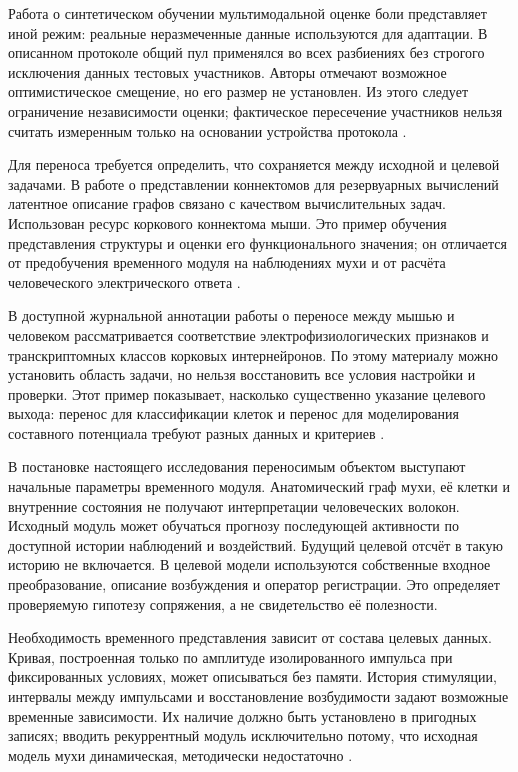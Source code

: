 Работа о синтетическом обучении мультимодальной оценке боли представляет иной режим: реальные неразмеченные данные используются для адаптации. В описанном протоколе общий пул применялся во всех разбиениях без строгого исключения данных тестовых участников. Авторы отмечают возможное оптимистическое смещение, но его размер не установлен. Из этого следует ограничение независимости оценки; фактическое пересечение участников нельзя считать измеренным только на основании устройства протокола \cite{s149}.

Для переноса требуется определить, что сохраняется между исходной и целевой задачами. В работе о представлении коннектомов для резервуарных вычислений латентное описание графов связано с качеством вычислительных задач. Использован ресурс коркового коннектома мыши. Это пример обучения представления структуры и оценки его функционального значения; он отличается от предобучения временного модуля на наблюдениях мухи и от расчёта человеческого электрического ответа \cite{s892}.

В доступной журнальной аннотации работы о переносе между мышью и человеком рассматривается соответствие электрофизиологических признаков и транскриптомных классов корковых интернейронов. По этому материалу можно установить область задачи, но нельзя восстановить все условия настройки и проверки. Этот пример показывает, насколько существенно указание целевого выхода: перенос для классификации клеток и перенос для моделирования составного потенциала требуют разных данных и критериев \cite{s873}.

В постановке настоящего исследования переносимым объектом выступают начальные параметры временного модуля. Анатомический граф мухи, её клетки и внутренние состояния не получают интерпретации человеческих волокон. Исходный модуль может обучаться прогнозу последующей активности по доступной истории наблюдений и воздействий. Будущий целевой отсчёт в такую историю не включается. В целевой модели используются собственные входное преобразование, описание возбуждения и оператор регистрации. Это определяет проверяемую гипотезу сопряжения, а не свидетельство её полезности.

Необходимость временного представления зависит от состава целевых данных. Кривая, построенная только по амплитуде изолированного импульса при фиксированных условиях, может описываться без памяти. История стимуляции, интервалы между импульсами и восстановление возбудимости задают возможные временные зависимости. Их наличие должно быть установлено в пригодных записях; вводить рекуррентный модуль исключительно потому, что исходная модель мухи динамическая, методически недостаточно \cite{posture,s877}.

